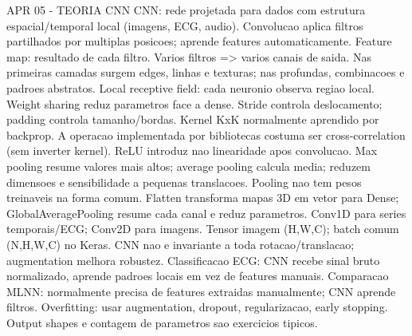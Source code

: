 APR 05 - TEORIA CNN
CNN: rede projetada para dados com estrutura espacial/temporal local (imagens, ECG, audio).
Convolucao aplica filtros partilhados por multiplas posicoes; aprende features automaticamente.
Feature map: resultado de cada filtro. Varios filtros => varios canais de saida.
Nas primeiras camadas surgem edges, linhas e texturas; nas profundas, combinacoes e padroes abstratos.
Local receptive field: cada neuronio observa regiao local. Weight sharing reduz parametros face a dense.
Stride controla deslocamento; padding controla tamanho/bordas.
Kernel KxK normalmente aprendido por backprop.
A operacao implementada por bibliotecas costuma ser cross-correlation (sem inverter kernel).
ReLU introduz nao linearidade apos convolucao.
Max pooling resume valores mais altos; average pooling calcula media; reduzem dimensoes e sensibilidade a pequenas translacoes.
Pooling nao tem pesos treinaveis na forma comum.
Flatten transforma mapas 3D em vetor para Dense; GlobalAveragePooling resume cada canal e reduz parametros.
Conv1D para series temporais/ECG; Conv2D para imagens.
Tensor imagem (H,W,C); batch comum (N,H,W,C) no Keras.
CNN nao e invariante a toda rotacao/translacao; augmentation melhora robustez.
Classificacao ECG: CNN recebe sinal bruto normalizado, aprende padroes locais em vez de features manuais.
Comparacao MLNN: normalmente precisa de features extraidas manualmente; CNN aprende filtros.
Overfitting: usar augmentation, dropout, regularizacao, early stopping.
Output shapes e contagem de parametros sao exercicios tipicos.